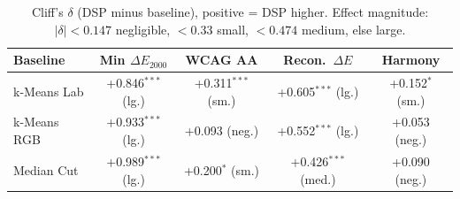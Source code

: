 \begin{table}[htbp]
\centering
\caption{Cliff's $\delta$ (DSP minus baseline), positive = DSP higher. Effect magnitude: $|\delta|<0.147$ negligible, $<0.33$ small, $<0.474$ medium, else large.}
\label{tab:cliffs_delta}
\setlength{\tabcolsep}{5pt}
\begin{tabular}{lcccc}
\hline\hline
Baseline & Min $\Delta E_{2000}$ & WCAG AA & Recon.\ $\Delta E$ & Harmony \\
\hline
k-Means Lab & +0.846$^{\mathrm{***}}$ {\scriptsize(lg.)} & +0.311$^{\mathrm{***}}$ {\scriptsize(sm.)} & +0.605$^{\mathrm{***}}$ {\scriptsize(lg.)} & +0.152$^{\mathrm{*}}$ {\scriptsize(sm.)} \\
k-Means RGB & +0.933$^{\mathrm{***}}$ {\scriptsize(lg.)} & +0.093 {\scriptsize(neg.)} & +0.552$^{\mathrm{***}}$ {\scriptsize(lg.)} & +0.053 {\scriptsize(neg.)} \\
Median Cut & +0.989$^{\mathrm{***}}$ {\scriptsize(lg.)} & +0.200$^{\mathrm{*}}$ {\scriptsize(sm.)} & +0.426$^{\mathrm{***}}$ {\scriptsize(med.)} & +0.090 {\scriptsize(neg.)} \\
\hline\hline
\end{tabular}
\end{table}